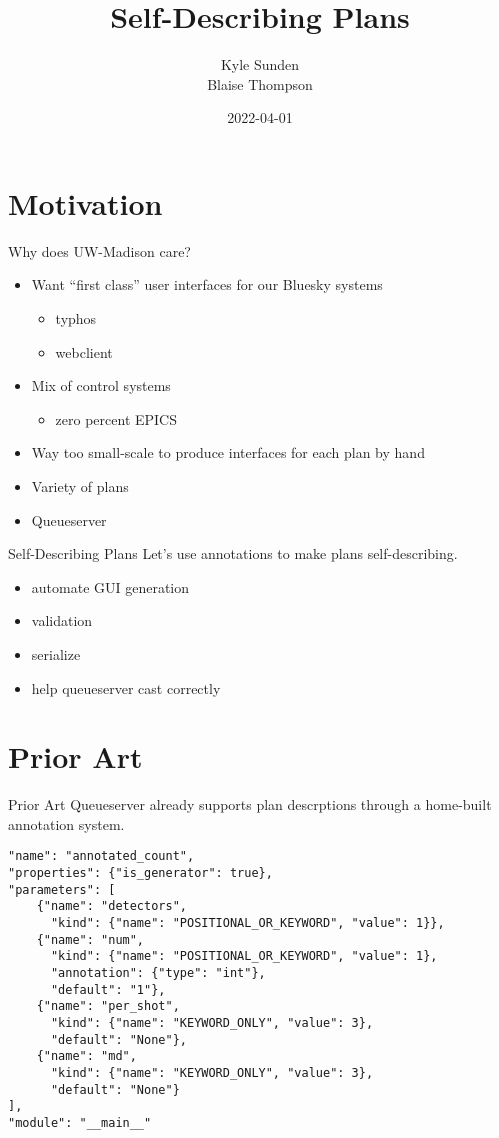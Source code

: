 \documentclass{presentation}
\title{Self-Describing Plans}
\author{Kyle Sunden \\ Blaise Thompson}
\institute{University of Wisconsin--Madison}
\date{2022-04-01}
\begin{document}
\maketitle

\section{Motivation}

\begin{frame}{Why does UW-Madison care?}
  \begin{itemize}
    \item Want ``first class'' user interfaces for our Bluesky systems
    \begin{itemize}
      \item typhos
      \item webclient
    \end{itemize}
    \item Mix of control systems
    \begin{itemize}
      \item zero percent EPICS
    \end{itemize}
    \item Way too small-scale to produce interfaces for each plan by hand
    \item Variety of plans
    \item Queueserver
  \end{itemize}
\end{frame}

\begin{frame}{Self-Describing Plans}
  Let's use annotations to make plans self-describing.
  \begin{itemize}
    \item{automate GUI generation}
    \item{validation}
    \item{serialize}
    \item{help queueserver cast correctly}
  \end{itemize}
\end{frame}

\section{Prior Art}

\begin{frame}[fragile]{Prior Art}
  Queueserver already supports plan descrptions through a home-built annotation system.
  \vfill

  \scriptsize
  \begin{verbatim}
"name": "annotated_count",
"properties": {"is_generator": true},
"parameters": [
    {"name": "detectors",
      "kind": {"name": "POSITIONAL_OR_KEYWORD", "value": 1}},
    {"name": "num",
      "kind": {"name": "POSITIONAL_OR_KEYWORD", "value": 1},
      "annotation": {"type": "int"},
      "default": "1"},
    {"name": "per_shot",
      "kind": {"name": "KEYWORD_ONLY", "value": 3},
      "default": "None"},
    {"name": "md",
      "kind": {"name": "KEYWORD_ONLY", "value": 3},
      "default": "None"}
],
"module": "__main__"
  \end{verbatim}
\end{frame}
\end{document}
